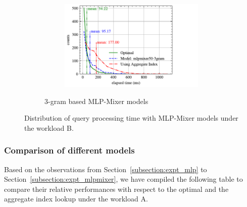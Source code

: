 \begin{figure}[!h]
\begin{subfigure}{0.45\textwidth}
\begin{subfigure}{\textwidth}
		\end{subfigure}
		\vfill
		\begin{subfigure}{\textwidth}
			\centering
			\includegraphics[]{my/graphics/perf_dist_mlpmixer50_3gram_B.pdf}
		\end{subfigure}
		\caption{3-gram based MLP-Mixer models}
	\end{subfigure}
	\caption{Distribution of query processing time with MLP-Mixer models under the workload B.}
	\label{fig:mlpmixer_perf_all_B}
\end{figure}

\subsubsection{Comparison of different models}

Based on the observations from Section~\ref{subsection:expt_mlp} to Section~\ref{subsection:expt_mlpmixer}, we have compiled the following table to compare their relative performances with respect to the optimal and the aggregate index lookup under the workload A.

